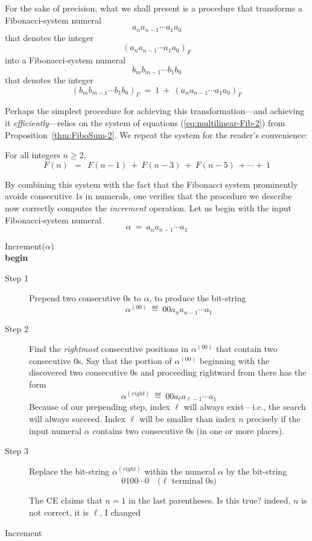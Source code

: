 
\smallskip

\noindent
For the sake of precision, what we shall present is a procedure that transforms a Fibonacci-system numeral
\[ a_n a_{n-1} \cdots a_1 a_0 \]
that denotes the integer
\[ (a_n a_{n-1} \cdots a_1 a_0)_F \]
into a Fibonacci-system numeral
\[ b_m b_{m-1} \cdots b_1 b_0 \]
that denotes the integer
\[ (b_m b_{m-1} \cdots b_1 b_0)_F \ = \ 1 \ + \ (a_n a_{n-1} \cdots a_1 a_0)_F \]

Perhaps the simplest procedure for achieving this transformation---and achieving it {\em efficiently}---relies on the system of equations (\ref{eq:multilinear-Fib-2}) from Proposition~\ref{thm:FiboSum-2}.  We repeat the system for the reader's convenience:

\medskip

\noindent For all integers $n \geq 2$,
\[ F(n) \ \ = \ \ F(n-1) \ + \ F(n-3) \ + \ F(n-5) \ + \cdots + \ 1 \]

\medskip

By combining this system with the fact that the Fibonacci system prominently avoids consecutive $1$s in numerals, one verifies that the procedure we describe now correctly computes the {\em increment} operation.  Let us begin with the input Fibonacci-system numeral
\[ \alpha \ = \  a_n a_{n-1} \cdots a_1 \]

\bigskip

 {\sf Increment}($\alpha$) \\
{\bf begin}
\begin{description}
\item[{\sf Step} 1]
Prepend two consecutive $0$s to $\alpha$, to produce the bit-string
\[  \alpha^{(00)} \ \eqdef \  0 0 a_n a_{n-1} \cdots a_1 \]

\item[{\sf Step} 2]
Find the {\em rightmost} consecutive positions in $\alpha^{(00)}$ that contain two consecutive $0$s.  Say that the portion of $\alpha^{(00)}$ beginning with the discovered two consecutive $0$s and proceeding rightward from there has the form
\[  \alpha^{(right)} \ \eqdef \  0 0 a_\ell a_{\ell-1} \cdots a_1 \]
Because of our prepending step, index $\ell$ will always exist---i.e., the search will always succeed.   Index $\ell$ will be smaller than index $n$ precisely if the input numeral $\alpha$ contains two consecutive $0$s (in one or more places).

\item[{\sf Step} 3]
Replace the bit-string $\alpha^{(right)}$ within the numeral $\alpha$ by the bit-string
\[ 0 1 0 0 \cdots 0 \ \ \ \mbox{ ($\ell$ terminal $0$s)} \]

{\Arny The CE claims that $n=1$ in the last parentheses.  Is this true?}
{\Denis indeed, $n$ is not correct, it is $\ell$, I changed}

\end{description}
 {\sf Increment}

